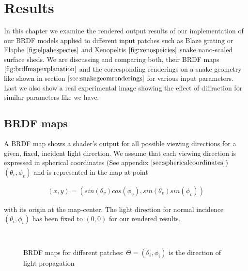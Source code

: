 \chapter{Results}
In this chapter we examine the rendered output results of our implementation of our BRDF models applied to different input patches such as Blaze grating or Elaphe $\ref{fig:elpahespecies}$ and Xenopeltis $\ref{fig:xenospeicies}$ snake nano-scaled surface sheds. We are discussing and comparing both, their BRDF maps $\ref{fig:brdfmapexplanation}$ and the corresponding renderings on a snake geometry like shown in section $\ref{sec:snakegeomrenderings}$ for various input parameters. Last we also show a real experimental image showing the effect of diffraction for similar parameters like we have.

\section{BRDF maps}
A BRDF map shows a shader's output for all possible viewing directions for a given, fixed, incident light direction. We assume that each viewing direction is expressed in spherical coordinates (See appendix $\ref{sec:sphericalcoordinates}$) $(\theta_v, \phi_v)$ and is represented in the map at point 

\begin{align}
(x,y) = (sin(\theta_v)cos(\phi_v), sin(\theta_v)sin(\phi_v))
\end{align}

with its origin at the map-center. The light direction for normal incidence $(\theta_i, \phi_i)$ has been fixed to $(0,0)$ for our rendered results.

\begin{figure}[H]
  \centering
~
~

\caption{BRDF maps for different patches: $\Theta=(\theta_i,\phi_i)$ is the direction of light propagation}
\label{fig:brdfmapexplanation}
\end{figure}

